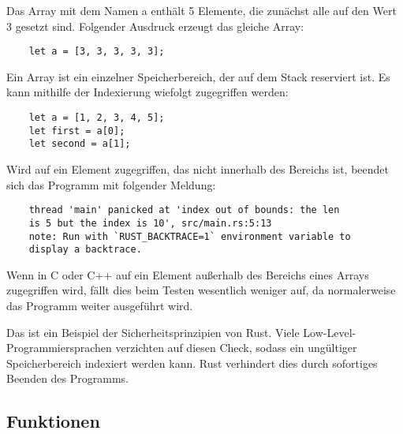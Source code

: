 Das Array mit dem Namen \glqq a\grqq{} enthält 5 Elemente, die zunächst alle auf den Wert 3 gesetzt sind. Folgender Ausdruck erzeugt das gleiche Array:

\begin{lstlisting}
    let a = [3, 3, 3, 3, 3];
\end{lstlisting}

Ein Array ist ein einzelner Speicherbereich, der auf dem Stack reserviert ist. Es kann mithilfe der Indexierung wiefolgt zugegriffen werden:

\begin{lstlisting}
    let a = [1, 2, 3, 4, 5];
    let first = a[0];
    let second = a[1];
\end{lstlisting}

Wird auf ein Element zugegriffen, das nicht innerhalb des Bereichs ist, beendet sich das Programm mit folgender Meldung:

\begin{lstlisting}
    thread 'main' panicked at 'index out of bounds: the len
    is 5 but the index is 10', src/main.rs:5:13
    note: Run with `RUST_BACKTRACE=1` environment variable to
    display a backtrace.
\end{lstlisting}

Wenn in C oder C++ auf ein Element außerhalb des Bereichs eines Arrays zugegriffen wird, fällt dies beim Testen wesentlich weniger auf, da normalerweise das Programm weiter ausgeführt wird.

Das ist ein Beispiel der Sicherheitsprinzipien von Rust. Viele Low-Level-Pro\-gram\-mier\-spra\-chen verzichten auf diesen Check, sodass ein ungültiger Speicherbereich indexiert werden kann. Rust verhindert dies durch sofortiges Beenden des Programms.

\subsection{Funktionen}


